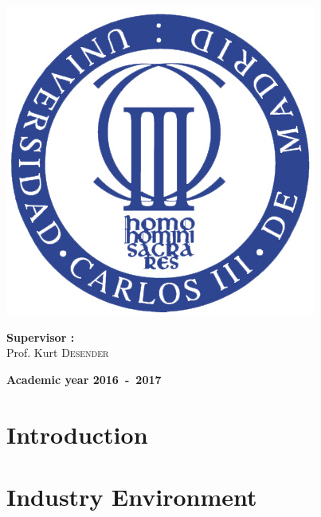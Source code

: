 \documentclass[12pt,a4paper,oneside]{book}
\begin{document}
\begin{titlepage}
\begin{center}
\includegraphics[keepaspectratio=true,width=\textwidth-2cm]{../images/Seal_of_the_University_of_Carlos_III.jpg}
\vfill{}
\begin{flushleft}{\large \textbf{Supervisor  :}}\\
{\large Prof. Kurt \textsc{Desender}}
\end{flushleft}{\large\par}
\vfill{}\vfill{}\enlargethispage{2cm}
\textbf{Academic year 2016~-~2017}
\end{center}
\end{titlepage}



\newpage
\thispagestyle{empty} 
\null

\frontmatter

\tableofcontents

\mainmatter

\chapter{Introduction}

\chapter{Industry Environment}
\label{iechap}
\end{document}
